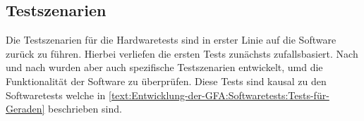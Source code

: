 \subsection{Testszenarien}

Die Testszenarien für die Hardwaretests sind in erster Linie auf die Software zurück zu führen. Hierbei verliefen die ersten Tests zunächsts zufallsbasiert. Nach und nach wurden aber auch spezifische Testszenarien entwickelt, umd die Funktionalität der Software zu überprüfen. Diese Tests sind kausal zu den Softwaretests welche in \autoref{text:Entwicklung-der-GFA:Softwaretests:Tests-für-Geraden}  beschrieben sind. 
